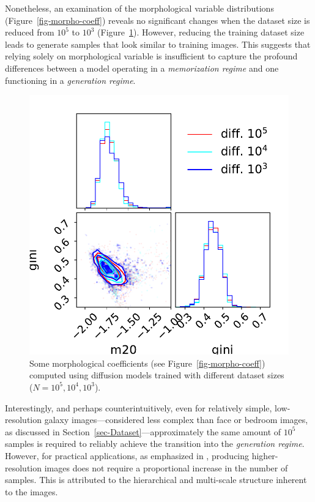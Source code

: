 \documentclass[fleqn,usenatbib]{mnras}
\begin{document}
Nonetheless, an examination of the morphological variable distributions (Figure~\ref{fig-morpho-coeff}) reveals no significant changes when the dataset size is reduced from $10^5$ to $10^3$ (Figure~\ref{fig-morpho-coeff-diff-comparison}). However, reducing the training dataset size leads to generate samples that look similar to training images. This suggests that relying solely on morphological variable is insufficient to capture the profound differences between a model operating in a \textit{memorization regime} and one functioning in a \textit{generation regime}.
%
\begin{figure}
    \centering
	\includegraphics[width=0.7\linewidth]{fig-gini-m20-diff-compare_0.pdf}
	\caption{Some morphological coefficients (see Figure~\ref{fig-morpho-coeff}) computed using diffusion models trained with different dataset sizes ($N=10^5, 10^4, 10^3$).}
	\label{fig-morpho-coeff-diff-comparison}
\end{figure}

{\color{red} 
Interestingly, and perhaps counterintuitively, even for relatively simple, low-resolution galaxy images---considered less complex than face or bedroom images, as discussed in Section~\ref{sec-Dataset}---approximately the same amount of $10^5$ samples is required to reliably achieve the transition into the \textit{generation regime}. However, for practical applications, as emphasized in \cite{kadkhodaie2024generalization}, producing higher-resolution images does not require a proportional increase in the number of samples. This is attributed to the hierarchical and multi-scale structure inherent to the images.
}
\end{document}
